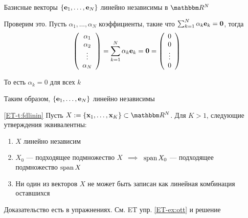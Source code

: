 \begin{frame}
    
    \vspace{2em}
    \Eg Базисные векторы $\{{\mathbf e}_1, \ldots, {\mathbf e}_N\}$
    линейно независимы в $\RR^N$

    Проверим это. Пусть $\alpha_1, \ldots, \alpha_N$ коэффициенты, такие что
    $\sum_{k=1}^N \alpha_k {\mathbf e}_k = {\mathbf 0}$, тогда
    \begin{equation*}
        \left(
        \begin{array}{c}
            \alpha_1 \\
            \alpha_2 \\
            \vdots \\
            \alpha_N
        \end{array}
        \right)
        = \sum_{k=1}^N \alpha_k {\mathbf e}_k 
        = {\mathbf 0}
        =
        \left(
        \begin{array}{c}
            0 \\
            0 \\
            \vdots \\
            0
        \end{array}
        \right)
    \end{equation*}

    То есть $\alpha_k = 0$ для всех $k$
    
    Таким образом, $\{{\mathbf e}_1, \ldots, {\mathbf e}_N\}$ линейно независимы

\end{frame}

\begin{frame}

    \vspace{2em}
    \Thm\eqref{ET-t:fdlinin}
        Пусть $X := \{\boldx_1,\ldots, \boldx_K\} \subset \RR^N$.  Для $K > 1$, следующие утверждения эквивалентны:
        \begin{enumerate}
            \item $X$ линейно независим
            \item $X_0$ --- подходящее подмножество $X$
                $\,\implies\,$ $\operatorname{span} X_0$ --- подходящее подмножество $\operatorname{span} X$
            \item Ни один из векторов $X$ не может быть записан как линейная комбинация оставшихся
        \end{enumerate}
    Доказательство есть в упражнениях. См. ET упр. \ref{ET-ex:ott} и решение
    
\end{frame}

